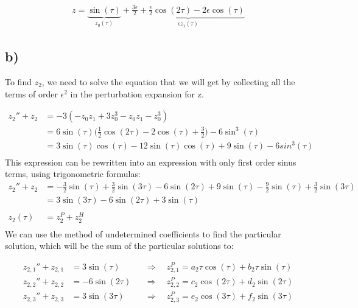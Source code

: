 \documentclass[a4paper,10pt]{article}
\begin{document}
\begin{align}
z = \underbrace{\sin (\tau)}_\text{$z_0(\tau)$} + \underbrace{\frac{3 \epsilon}{2} + \frac{\epsilon}{2} \cos(2 \tau) - 2 \epsilon \cos(\tau)}_\text{$\epsilon z_1(\tau)$} \label{z_sol_twoterms}
\end{align}

\subsection*{b)}
To find $z_2$, we need to solve the equation that we will get by collecting all the terms of order $\epsilon^2$ in the perturbation expansion for z.  

\begin{align*}
z_2''+ z_2 &= -3(-z_0 z_1 + 3z_0^3 - z_0 z_1 - z_0^3)\\
&= 6 \sin(\tau) \bigg(\frac{1}{2} \cos(2 \tau) - 2 \cos(\tau) + \frac{3}{2}\bigg) - 6 \sin^3(\tau)\\
&= 3 \sin(\tau) \cos(\tau) - 12 \sin(\tau) \cos(\tau) + 9 \sin(\tau) - 6 sin^3(\tau)\\
\end{align*}
This expression can be rewritten into an expression with only first order sinus terms, using trigonometric formulas:
\begin{align}
z_2''+ z_2 &= -\frac{3}{2} \sin(\tau) + \frac{3}{2} \sin(3 \tau) - 6 \sin (2 \tau) + 9 \sin(\tau) - \frac{9}{2} \sin(\tau) + \frac{3}{2} \sin(3 \tau) \nonumber \\
&= 3 \sin(3 \tau) -6 \sin (2 \tau) + 3 \sin(\tau) \label{z2_eq}\\ \nonumber \\
z_2(\tau) &= z_2^P + z_2^H \nonumber\\\nonumber
\end{align}
We can use the method of undetermined coefficients to find the particular solution, which will be the sum of the particular solutions to:

\begin{align}
z_{2,1}'' + z_{2,1} &= 3 \sin(\tau) &&\Rightarrow \quad z_{2,1}^P= a_2 \tau \cos(\tau) + b_2 \tau \sin(\tau) \label{z21_p} \\
z_{2,2}'' + z_{2,2} &= -6 \sin(2 \tau)  &&\Rightarrow \quad z_{2,2}^P= c_2 \cos(2 \tau) + d_2 \sin(2 \tau) \label{z22_p} \\
z_{2,3}'' + z_{2,3} &= 3 \sin(3 \tau) &&\Rightarrow \quad z_{2,3}^P= e_2 \cos(3 \tau) + f_2 \sin(3 \tau) \label{z23_p} \\\nonumber
\end{align}
\end{document}
